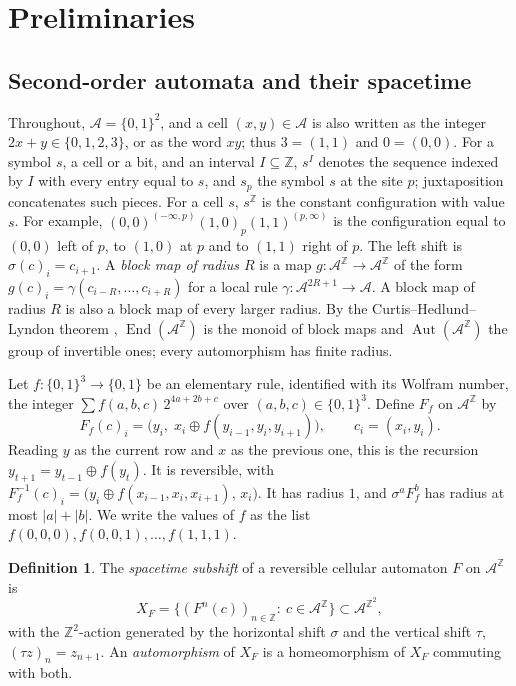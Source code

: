 \documentclass[11pt]{amsart}
\theoremstyle{definition}
\newtheorem{definition}[theorem]{Definition}
\theoremstyle{remark}
\theoremstyle{plain}
\newcommand{\Z}{\mathbb{Z}}
\newcommand{\A}{\mathcal{A}}
\newcommand{\Aut}{\operatorname{Aut}}
\newcommand{\End}{\operatorname{End}}
\newcommand{\sh}{\sigma}
\begin{document}
\section{Preliminaries}\label{sec:prelim}

\subsection{Second-order automata and their spacetime}\label{sec:defs}

Throughout, $\A=\{0,1\}^2$, and a cell $(x,y)\in\A$ is also written as the integer $2x+y\in\{0,1,2,3\}$, or as the word $xy$; thus $3=(1,1)$ and $0=(0,0)$. For a symbol $s$, a cell or a bit, and an interval $I\subseteq\Z$, $s^I$ denotes the sequence indexed by $I$ with every entry equal to $s$, and $s_p$ the symbol $s$ at the site $p$; juxtaposition concatenates such pieces. For a cell $s$, $s^{\Z}$ is the constant configuration with value $s$. For example, $(0,0)^{(-\infty,p)}(1,0)_p(1,1)^{(p,\infty)}$ is the configuration equal to $(0,0)$ left of $p$, to $(1,0)$ at $p$ and to $(1,1)$ right of $p$. The left shift is $\sh(c)_i=c_{i+1}$. A \emph{block map of radius $R$} is a map $g\colon\A^{\Z}\to\A^{\Z}$ of the form $g(c)_i=\gamma(c_{i-R},\dots,c_{i+R})$ for a local rule $\gamma\colon\A^{2R+1}\to\A$. A block map of radius $R$ is also a block map of every larger radius. By the Curtis--Hedlund--Lyndon theorem \cite{Hedlund1969}, $\End(\A^{\Z})$ is the monoid of block maps and $\Aut(\A^{\Z})$ the group of invertible ones; every automorphism has finite radius.

Let $f\colon\{0,1\}^3\to\{0,1\}$ be an elementary rule, identified with its Wolfram number, the integer $\sum f(a,b,c)\,2^{4a+2b+c}$ over $(a,b,c)\in\{0,1\}^3$. Define $F_f$ on $\A^{\Z}$ by
\begin{equation}\label{eq:F}
F_f(c)_i=\bigl(y_i,\;x_i\oplus f(y_{i-1},y_i,y_{i+1})\bigr),\qquad c_i=(x_i,y_i).
\end{equation}
Reading $y$ as the current row and $x$ as the previous one, this is the recursion $y_{t+1}=y_{t-1}\oplus f(y_t)$. It is reversible, with $F_f^{-1}(c)_i=\bigl(y_i\oplus f(x_{i-1},x_i,x_{i+1}),\,x_i\bigr)$. It has radius $1$, and $\sh^aF_f^b$ has radius at most $|a|+|b|$. We write the values of $f$ as the list $f(0,0,0),f(0,0,1),\dots,f(1,1,1)$.

\begin{definition}
The \emph{spacetime subshift} of a reversible cellular automaton $F$ on $\A^{\Z}$ is
\[
X_F=\bigl\{(F^n(c))_{n\in\Z}:\ c\in\A^{\Z}\bigr\}\subset\A^{\Z^2},
\]
with the $\Z^2$-action generated by the horizontal shift $\sh$ and the vertical shift $\tau$, $(\tau z)_{n}=z_{n+1}$. An \emph{automorphism} of $X_F$ is a homeomorphism of $X_F$ commuting with both.
\end{definition}
\end{document}

